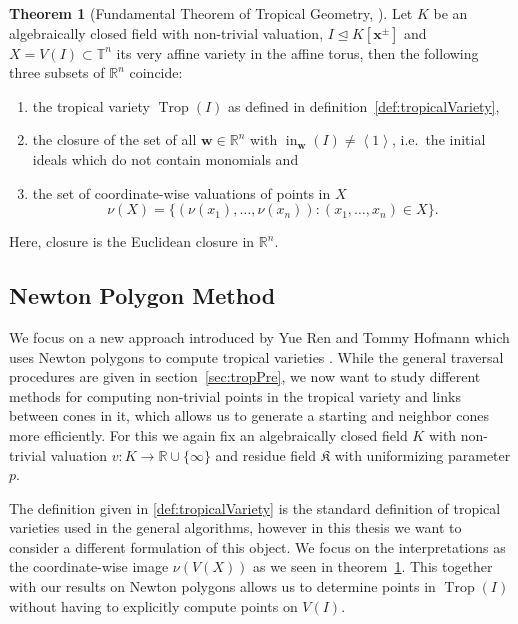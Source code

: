 \documentclass[
  paper=a4,
  DIV=14,
  fontsize=12pt,
  titlepage,
  bibliography=totoc,
  listof=totoc,
  pagesize=pdftex
]{scrartcl}
\numberwithin{figure}{section}
\numberwithin{equation}{section}
\numberwithin{table}{section}
\newcommand*\setR{\mathds{R}}
\newcommand*\setT{\mathds{T}}
\newcommand*\ideal[1]{\left\langle #1 \right\rangle}
\let\vec\mathbf
\let\idealof\trianglelefteq
\DeclareMathOperator{\Trop}{Trop}
\DeclareMathOperator{\initial}{in}
\theoremstyle{definition}
\newtheorem{theorem}[definition]{Theorem}
\numberwithin{definition}{section}
\begin{document}
\begin{theorem}[Fundamental Theorem of Tropical Geometry,
  {\cite[Theorem~3.2.5]{sturmMacTrop}}]
  Let $K$ be an algebraically closed field with non-trivial valuation, $I \idealof K[\vec
  x^\pm]$ and $X = V(I) \subset \setT^n$ its very affine variety in the affine torus, then
  the following three subsets of $\setR^n$ coincide:
  \begin{enumerate}
    \item the tropical variety $\Trop(I)$ as defined in
      definition~\ref{def:tropicalVariety},
    \item the closure of the set of all $\vec w \in \setR^n$ with $\initial_{\vec w}(I)
      \neq \ideal1$, i.e.\ the initial ideals which do not contain monomials and
    \item the set of coordinate-wise valuations of points in $X$
      \[
        \nu(X) = \{ (\nu(x_1), \dots, \nu(x_n)) : (x_1, \dots, x_n) \in X \}.
      \]
  \end{enumerate}
  Here, closure is the Euclidean closure in $\setR^n$.
  \label{thm:fundamentalThm}
\end{theorem}


\subsection{Newton Polygon Method}

We focus on a new approach introduced by Yue Ren and Tommy Hofmann which uses Newton
polygons to compute tropical varieties \cite{tropPointsLinks}. While the general traversal
procedures are given in section~\ref{sec:tropPre}, we now want to study different methods
for computing non-trivial points in the tropical variety and links between cones in it,
which allows us to generate a starting and neighbor cones more efficiently. For this we
again fix an algebraically closed field $K$ with non-trivial valuation $v:K\to\setR \cup
\{\infty\}$ and residue field $\mathfrak K$ with uniformizing parameter $p$.

The definition given in \ref{def:tropicalVariety} is the standard definition of tropical
varieties used in the general algorithms, however in this thesis we want to consider a
different formulation of this object. We focus on the interpretations as the
coordinate-wise image $\nu(V(X))$ as we seen in theorem~\ref{thm:fundamentalThm}. This
together with our results on Newton polygons allows us to determine points in $\Trop(I)$
without having to explicitly compute points on $V(I)$.
\end{document}
